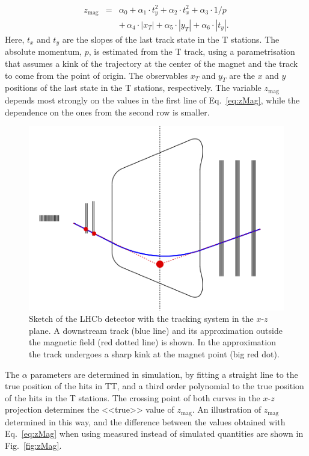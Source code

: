 \begin{eqnarray}
\label{eq:zMag}
z_{\text{mag}} & = &\alpha_{0} + \alpha_{1} \cdot t_{y}^{2} + \alpha_{2} \cdot t_{x}^{2} + \alpha_{3} \cdot 1/p \\
& & +\, \alpha_{4} \cdot | x_{T} | + \alpha_{5} \cdot | y_{T} | + \alpha_{6} \cdot | t_{y} |. \nonumber
\end{eqnarray}
Here, $t_{x}$ and $t_{y}$ are the slopes of the last track state in the
T stations. The absolute momentum, $p$, is
estimated from the T track, using a parametrisation that assumes a kink of the trajectory 
at the center of the magnet and the track to come from the point of origin.
The observables $x_{T}$ and $y_{T}$ are the
$x$ and $y$ positions of the last state in the T stations, respectively. The
variable $z_{\text{mag}}$ depends most strongly on the values in the first line of
Eq.~\ref{eq:zMag}, while the dependence on the ones from the second row is
smaller.

\begin{figure}[!htbp]
 \begin{center}
    \includegraphics[width=0.49\linewidth]{figures/magnetPointDownstream2.png}
   \caption{Sketch of the LHCb detector with the tracking system in the $x$-$z$ plane. A downstream track (blue line) and its approximation outside the magnetic field (red dotted line) is shown. In the approximation the track undergoes a sharp kink at the magnet point (big red dot).
     \label{fig:magnetPointSketch}}
 \end{center}
\end{figure}

The $\alpha$ parameters are determined in simulation, by fitting a straight line to the
true position of the hits in TT, and a third order polynomial to the true
position of the hits in the T stations. The crossing point of both curves in the $x$-$z$ projection
determines the <<true>> value of $z_{\text{mag}}$. An illustration of $z_{\text{mag}}$ determined in this way, and
the difference between the values obtained with Eq.~\ref{eq:zMag} when using measured 
instead of simulated quantities are shown in Fig.~\ref{fig:zMag}.


